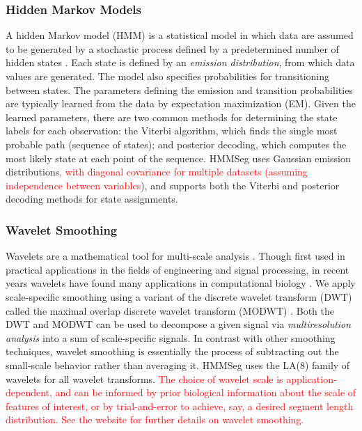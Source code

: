 \documentclass{bioinfo}
\begin{document}
\subsubsection*{Hidden Markov Models}
A hidden Markov model (HMM) is a statistical model in which data are
assumed to be generated by a stochastic process defined by a
predetermined number of hidden states \citep{rabiner:tutorial}.  Each
state is defined by an {\em emission distribution}, from which data
values are generated.  The model also specifies probabilities for
transitioning between states.  The parameters defining the emission
and transition probabilities are typically learned from the data by
expectation maximization (EM).  Given the learned parameters, there
are two common methods for determining the state labels for each
observation: the Viterbi algorithm, which finds the single most
probable path (sequence of states); and posterior decoding, which
computes the most likely state at each point of the sequence.  HMMSeg
uses Gaussian emission distributions\textcolor{red}{, with diagonal
covariance for multiple datasets (assuming independence between
variables}), and supports both the Viterbi and posterior decoding
methods for state assignments.

\subsubsection*{Wavelet Smoothing}
Wavelets are a mathematical tool for multi-scale analysis
\citep{percival:wavelet}.  Though first used in practical applications
in the fields of engineering and signal processing, in recent years
wavelets have found many applications in computational biology
\citep{lio:wavelets}.  We apply scale-specific smoothing using a
variant of the discrete wavelet transform (DWT) called the maximal
overlap discrete wavelet transform (MODWT) \citep{percival:wavelet}.
Both the DWT and MODWT can be used to decompose a given signal via
{\it multiresolution analysis} into a sum of scale-specific signals.
In contrast with other smoothing techniques, wavelet smoothing is
essentially the process of subtracting out the small-scale behavior
rather than averaging it. HMMSeg uses the LA(8) family of wavelets for
all wavelet transforms. \textcolor{red}{The choice of wavelet scale is
application-dependent, and can be informed by prior biological
information about the scale of features of interest, or by
trial-and-error to achieve, say, a desired segment length
distribution. See the website for further details on wavelet
smoothing.}
\end{document}
